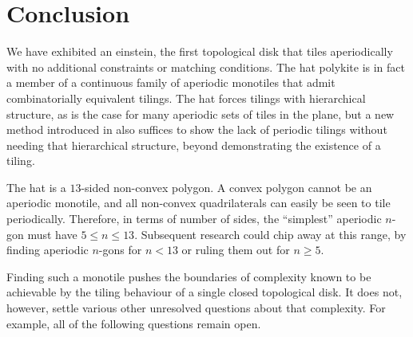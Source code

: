\section{Conclusion}
\label{sec:conclusion}

We have exhibited an einstein, the first topological disk that tiles
aperiodically with no additional constraints or matching conditions.
The hat polykite is in fact a member of a continuous family of aperiodic
monotiles that admit combinatorially equivalent tilings.
The hat forces
tilings with hierarchical structure, as is the case for many aperiodic
sets of tiles in the plane, but a new method introduced in
 also suffices to show the lack of periodic
tilings without needing that hierarchical structure, beyond
demonstrating the existence of a tiling.

The hat is a $13$-sided non-convex polygon.  A convex polygon cannot
be an aperiodic monotile, and all non-convex quadrilaterals can 
easily be seen to tile periodically.  Therefore, in terms of number of 
sides, the ``simplest'' aperiodic $n$-gon must have $5\le n \le 13$.
Subsequent research could chip away at this range, by finding aperiodic
$n$-gons for $n<13$ or ruling them out for $n\ge 5$.

Finding such a monotile pushes the boundaries of complexity known to
be achievable by the tiling behaviour of a single closed topological
disk.  It does not, however, settle various other unresolved
questions about that complexity.  For example, all of the following
questions remain open.


